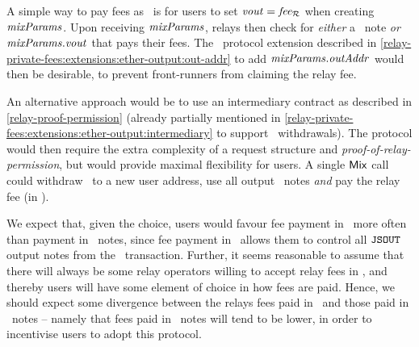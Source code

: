 A simple way to pay fees as \ether~is for users to set $\mathit{vout} = \mathit{fee_{\mathcal{R}}}$ when creating $\mathit{mixParams}$. Upon receiving $\mathit{mixParams}$, relays then check for \emph{either} a \zeth~note \emph{or} $\mathit{mixParams}.\mathit{vout}$ that pays their fees. The \zeth~protocol extension described in \cref{relay-private-fees:extensions:ether-output:out-addr} to add $\mathit{mixParams}.\mathit{outAddr}$ would then be desirable, to prevent front-runners from claiming the relay fee.

An alternative approach would be to use an intermediary contract as described in \cref{relay-proof-permission} (already partially mentioned in \cref{relay-private-fees:extensions:ether-output:intermediary} to support \ether~withdrawals). The protocol would then require the extra complexity of a request structure and \emph{proof-of-relay-permission}, but would provide maximal flexibility for users. A single $\mathsf{Mix}$ call could withdraw \ether~to a new user address, use all output \zeth~notes \emph{and} pay the relay fee (in \ether).

We expect that, given the choice, users would favour fee payment in \ether~more often than payment in \zeth~notes, since fee payment in \ether~allows them to control all $\mathtt{JSOUT}$ output notes from the \zeth~transaction. Further, it seems reasonable to assume that there will always be some relay operators willing to accept relay fees in \ether, and thereby users will have some element of choice in how fees are paid. Hence, we should expect some divergence between the relays fees paid in \ether~and those paid in \zeth~notes -- namely that fees paid in \zeth~notes will tend to be lower, in order to incentivise users to adopt this protocol.
